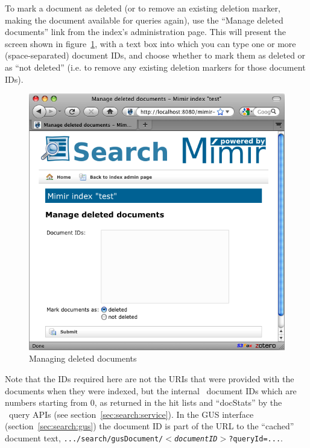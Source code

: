 To mark a document as deleted (or to remove an existing deletion marker, making
the document available for queries again), use the ``Manage deleted documents''
link from the index's administration page.  This will present the screen shown
in figure~\ref{fig:deleted-documents}, with a text box into which you can type
one or more (space-separated) document IDs, and choose whether to mark them as
deleted or as ``not deleted'' (i.e. to remove any existing deletion markers for
those document IDs).
%
\begin{figure}[htb!]
\begin{center}
\includegraphics[scale=0.5]{img/deleted-documents}
\end{center}
\caption{Managing deleted documents}
\label{fig:deleted-documents}
\end{figure}

Note that the IDs required here are not the URIs that were provided with the
documents when they were indexed, but the internal \Mimir\ document IDs which
are numbers starting from 0, as returned in the hit lists and ``docStats'' by
the \Mimir\ query APIs (see section~\ref{sec:search:service}).  In the GUS
interface (section~\ref{sec:search:gus}) the document ID is part of the URL to
the ``cached'' document text,
{\tt .../search/gusDocument/{\it $<$documentID$>$}?queryId=...}.
